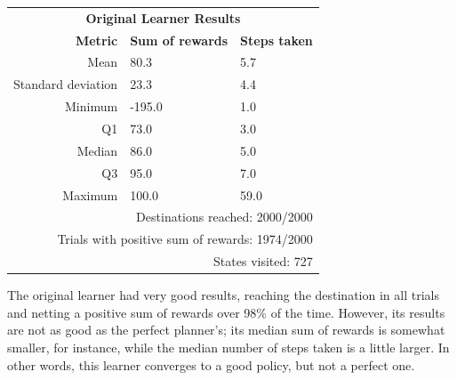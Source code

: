 \documentclass{article}
\begin{document}
\begin{center}
   \begin{tabular}{rll}
        \multicolumn{3}{c}{\textbf{Original Learner Results}} \\
        \textbf{Metric}    & \textbf{Sum of rewards}    &\textbf{Steps taken}\\
        Mean               & 80.3                       & 5.7\\
        Standard deviation & 23.3                       & 4.4\\
        Minimum            & -195.0                     & 1.0\\
        Q1                 & 73.0                       & 3.0\\
        Median             & 86.0                       & 5.0\\
        Q3                 & 95.0                       & 7.0\\
        Maximum            & 100.0                      & 59.0\\
        \multicolumn{3}{r}{Destinations reached: 2000/2000}\\
        \multicolumn{3}{r}{Trials with positive sum of rewards: 1974/2000}\\
        \multicolumn{3}{r}{States visited: 727}\\
    \end{tabular}
\end{center}

The original learner had very good results, reaching the destination in all trials and netting a positive sum of rewards over 98\% of the time. However, its results are not as good as the perfect planner's; its median sum of rewards is somewhat smaller, for instance, while the median number of steps taken is a little larger. In other words, this learner converges to a good policy, but not a perfect one.
\end{document}
